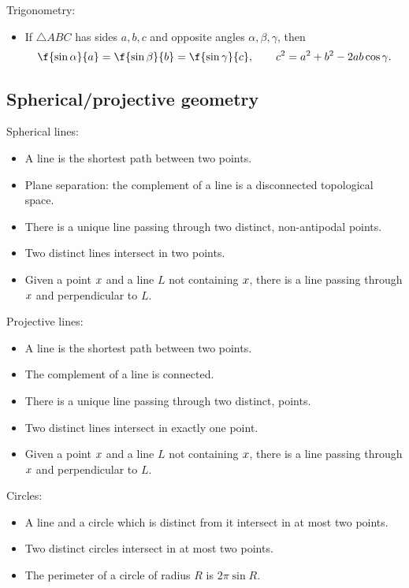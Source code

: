 Trigonometry:
\begin{itemize}
	\item If $\triangle ABC$ has sides $a,b,c$ and opposite angles $\alpha,\beta,\gamma$, then
	\begin{equation*}
		\f{\sin \alpha}{a} = \f{\sin \beta}{b} = \f{\sin\gamma}{c}, \qquad
		c^2 = a^2 + b^2 - 2ab \cos \gamma.
	\end{equation*}
\end{itemize}


	\pagebreak

\subsection{Spherical/projective geometry} %
\label{sub:spherical_p}

Spherical lines:
\begin{itemize}
	\shortskip
	\item A line is the shortest path between two points.
	\item Plane separation: the complement of a line is a disconnected topological space.
	\item There is a unique line passing through two distinct, non-antipodal points.
	\item Two distinct lines intersect in two points.
	\item Given a point $x$ and a line $L$ not containing $x$, there is a line passing through $x$ and perpendicular to $L$.
\end{itemize}

Projective lines:
\begin{itemize}
	\shortskip
	\item A line is the shortest path between two points.
	\item The complement of a line is connected.
	\item There is a unique line passing through two distinct, points.
	\item Two distinct lines intersect in exactly one point.
	\item Given a point $x$ and a line $L$ not containing $x$, there is a line passing through $x$ and perpendicular to $L$.
\end{itemize}

Circles:
\begin{itemize}
	\shortskip
	\item A line and a circle which is distinct from it intersect in at most two points.
	\item Two distinct circles intersect in at most two points.
	\item The perimeter of a circle of radius $R$ is $2\pi \sin R$.
\end{itemize}

